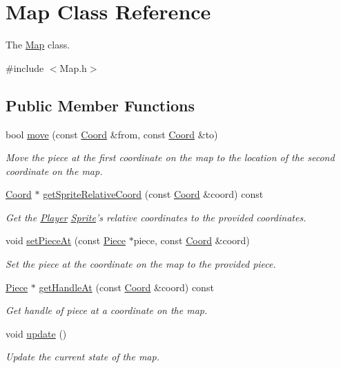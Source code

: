 \hypertarget{classMap}{\section{Map Class Reference}
\label{classMap}
}


The \hyperlink{classMap}{Map} class.  




{\ttfamily \#include $<$Map.\-h$>$}

\subsection*{Public Member Functions}
\begin{DoxyCompactItemize}
\item 
bool \hyperlink{classMap_a2f7ddbd8a2830d766e4c6aa05451a537}{move} (const \hyperlink{structCoord}{Coord} \&from, const \hyperlink{structCoord}{Coord} \&to)
\begin{DoxyCompactList}\small\item\em Move the piece at the first coordinate on the map to the location of the second coordinate on the map. \end{DoxyCompactList}\item 
\hyperlink{structCoord}{Coord} $\ast$ \hyperlink{classMap_ae55dbf516d3caebb9572540e2bedcf5f}{get\-Sprite\-Relative\-Coord} (const \hyperlink{structCoord}{Coord} \&coord) const 
\begin{DoxyCompactList}\small\item\em Get the \hyperlink{classPlayer}{Player} \hyperlink{classSprite}{Sprite}'s relative coordinates to the provided coordinates. \end{DoxyCompactList}\item 
void \hyperlink{classMap_a0dffeac7daa5b0ea4c4f6f288926698c}{set\-Piece\-At} (const \hyperlink{classPiece}{Piece} $\ast$piece, const \hyperlink{structCoord}{Coord} \&coord)
\begin{DoxyCompactList}\small\item\em Set the piece at the coordinate on the map to the provided piece. \end{DoxyCompactList}\item 
\hyperlink{classPiece}{Piece} $\ast$ \hyperlink{classMap_aecc5a11d70fd7b77a829932632cbf107}{get\-Handle\-At} (const \hyperlink{structCoord}{Coord} \&coord) const 
\begin{DoxyCompactList}\small\item\em Get handle of piece at a coordinate on the map. \end{DoxyCompactList}\item 
void \hyperlink{classMap_ab12643cc3a8d5e48f566c1abb571e9bf}{update} ()
\begin{DoxyCompactList}\small\item\em Update the current state of the map. \end{DoxyCompactList}\end{DoxyCompactItemize}


